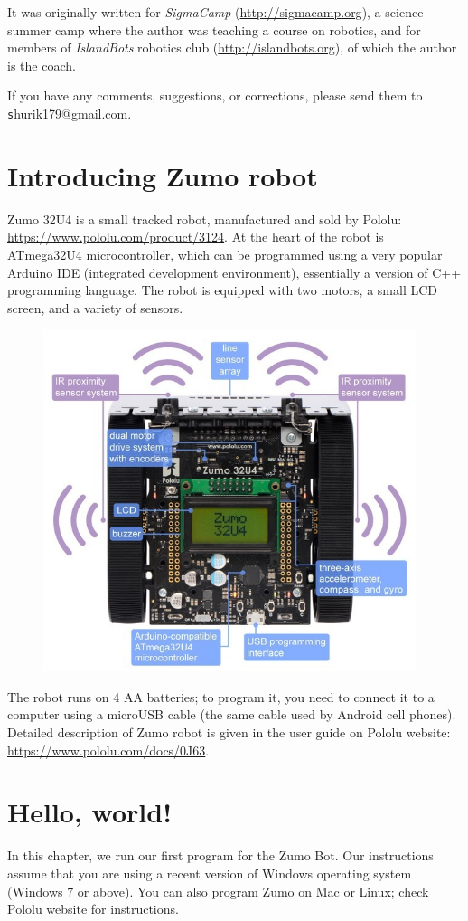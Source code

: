 \documentclass[oneside]{stml-l}
\numberwithin{figure}{chapter}
\begin{document}
It was originally written for  {\sl SigmaCamp}
(\url{http://sigmacamp.org}),  a science summer camp where the author was
teaching a course on robotics, and for members of {\sl IslandBots} robotics
club (\url{http://islandbots.org}), of which the author is the coach.


If you have any  comments, suggestions, or corrections, please send them
to {\texttt shurik179@gmail.com}.

\chapter{Introducing Zumo robot}
Zumo 32U4 is a small tracked robot, manufactured  and sold by Pololu:
\url{https://www.pololu.com/product/3124}. At the heart of the robot is
ATmega32U4 microcontroller, which can be programmed using a very
 popular Arduino IDE (integrated development environment), essentially
 a version of C++ programming language. The robot is equipped with two motors,
 a small LCD screen, and a variety of sensors.
 \begin{figure}[ht]
 \includegraphics[height=10cm]{figures/zumo-overview.jpg}
 \end{figure}

The robot runs on 4 AA batteries; to program it, you need to connect it to a
computer using a microUSB cable (the same cable  used by Android cell phones).
Detailed description of Zumo robot is given in the user guide on Pololu website:
\url{https://www.pololu.com/docs/0J63}.


\chapter{Hello, world!}
In this chapter, we run our first program for the Zumo Bot. Our instructions
assume that you are  using a recent version of Windows operating system
(Windows 7 or above).
You can also program
Zumo on  Mac or Linux; check
Pololu website for instructions.
\end{document}
